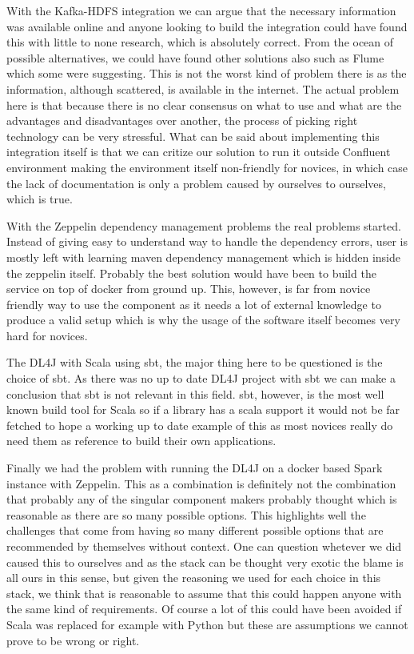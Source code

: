 With the Kafka-HDFS integration we can argue that the necessary information was available online and anyone looking to build the integration could have found this with little to none research, which is absolutely correct.
From the ocean of possible alternatives, we could have found other solutions also such as Flume which some were suggesting.
This is not the worst kind of problem there is as the information, although scattered, is available in the internet.
The actual problem here is that because there is no clear consensus on what to use and what are the advantages and disadvantages over another, the process of picking right technology can be very stressful.
What can be said about implementing this integration itself is that we can critize our solution to run it outside Confluent environment making the environment itself non-friendly for novices, in which case the lack of documentation is only a problem caused by ourselves to ourselves, which is true.

With the Zeppelin dependency management problems the real problems started.
Instead of giving easy to understand way to handle the dependency errors, user is mostly left with learning maven dependency management which is hidden inside the zeppelin itself.
Probably the best solution would have been to build the service on top of docker from ground up.
This, however, is far from novice friendly way to use the component as it needs a lot of external knowledge to produce a valid setup which is why the usage of the software itself becomes very hard for novices.

The DL4J with Scala using sbt, the major thing here to be questioned is the choice of sbt.
As there was no up to date DL4J project with sbt we can make a conclusion that sbt is not relevant in this field.
sbt, however, is the most well known build tool for Scala so if a library has a scala support it would not be far fetched to hope a working up to date example of this as most novices really do need them as reference to build their own applications.

Finally we had the problem with running the DL4J on a docker based Spark instance with Zeppelin.
This as a combination is definitely not the combination that probably any of the singular component makers probably thought which is reasonable as there are so many possible options.
This highlights well the challenges that come from having so many different possible options that are recommended by themselves without context.
One can question whetever we did caused this to ourselves and as the stack can be thought very exotic the blame is all ours in this sense, but given the reasoning we used for each choice in this stack, we think that is reasonable to assume that this could happen anyone with the same kind of requirements.
Of course a lot of this could have been avoided if Scala was replaced for example with Python but these are assumptions we cannot prove to be wrong or right.

